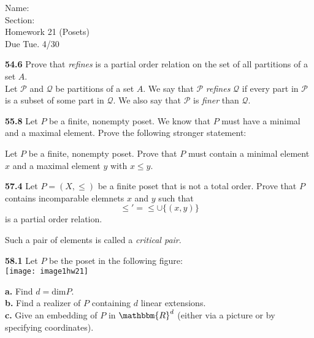 \documentclass[10pt]{article}
\begin{document}
\begin{flushright}
    Name: \underline{\hspace{3cm}}\\
    Section: \underline{\hspace{0.5cm}}\\
    Homework 21 (Posets)\\
    Due Tue. 4/30
\end{flushright}


\begin{framed}
    \textbf{54.6} Prove that \textit{refines} is a partial order relation on
    the set of all partitions of a set $A$.\\

    Let $\mathcal{P}$ and $\mathcal{Q}$ be partitions of a set $A$. We say that
    $\mathcal{P}$ \textit{refines} $\mathcal{Q}$ if every part in $\mathcal{P}$
    is a subset of some part in $\mathcal{Q}$. We also say that $\mathcal{P}$
    is \textit{finer} than $\mathcal{Q}$.
\end{framed}

\pagebreak

\begin{framed}
    \textbf{55.8} Let $P$ be a finite, nonempty poset. We know that $P$ must
    have a minimal and a maximal element. Prove the following stronger
    statement:

    Let $P$ be a finite, nonempty poset. Prove that $P$ must contain a
    minimal element $x$ and a maximal element $y$ with $x \leq y$.
\end{framed}

\pagebreak

\begin{framed}
    \textbf{57.4} Let $P = (X, \leq)$ be a finite poset that is not a total
    order. Prove that $P$ contains incomparable elemnets $x$ and $y$ such that
    \[ \leq' = \leq \cup \{(x, y)\} \]
    is a partial order relation.

    Such a pair of elements is called a \textit{critical pair}.
\end{framed}

\pagebreak

\begin{framed}
    \textbf{58.1} Let $P$ be the poset in the following figure:\\
    \texttt{[image: image1hw21]}

    \textbf{a.} Find $d = \textrm{dim} P$.\\

    \textbf{b.} Find a realizer of $P$ containing $d$ linear extensions.\\

    \textbf{c.} Give an embedding of $P$ in $\mathbbm{R}^d$ (either via a
    picture or by specifying coordinates).
\end{framed}
\end{document}
